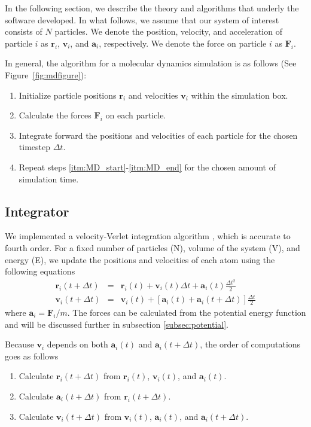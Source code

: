 \documentclass[12pt]{article}
\begin{document}
In the following section, we describe the theory and algorithms that underly the software developed.
%
In what follows, we assume that our system of interest consists of $N$ particles.
%
We denote the position, velocity, and acceleration of particle $i$ as $\mathbf{r}_i$, $\mathbf{v}_i$, and $\mathbf{a}_i$, respectively.
%
We denote the force on particle $i$ as $\mathbf{F}_i$.

In general, the algorithm for a molecular dynamics simulation is as follows (See Figure~\ref{fig:mdfigure}):

\begin{enumerate}
\item Initialize particle positions $\mathbf{r}_i$ and velocities $\mathbf{v}_i$ within the simulation box.
\item  \label{itm:MD_start} Calculate the forces $\mathbf{F}_i$ on each particle.
\item \label{itm:MD_end} Integrate forward the positions and velocities of each particle for the chosen timestep $\Delta t$.
\item Repeat steps \ref{itm:MD_start}-\ref{itm:MD_end} for the chosen amount of simulation time.
\end{enumerate}


\subsection{Integrator} \label{subsec:integrator}

We implemented a velocity-Verlet integration algorithm \cite{Swope1982}, which is accurate to fourth order.
%
For a fixed number of particles (N), volume of the system (V), and energy (E), we update the positions and velocities of each atom using the following equations
\begin{eqnarray}
\mathbf{r}_i (t + \Delta t)  & = & \mathbf{r}_i(t) + \mathbf{v}_i(t) \Delta t + \mathbf{a}_i(t) \frac{\Delta t^2}{2} \\
\mathbf{v}_i(t + \Delta t) & = & \mathbf{v}_i(t) + \left[\mathbf{a}_i(t) + \mathbf{a}_i(t + \Delta t) \right] \frac{\Delta t}{2}
\end{eqnarray}
where $\mathbf{a}_i = \mathbf{F}_i/m$.
%
The forces can be calculated from the potential energy function and will be discussed further in subsection \ref{subsec:potential}.

Because $\mathbf{v}_i$ depends on both $\mathbf{a}_i(t)$ and $\mathbf{a}_i(t+\Delta t)$, the order of computations goes as follows
\begin{enumerate}
\item Calculate $\mathbf{r}_i(t + \Delta t)$ from $\mathbf{r}_i(t)$, $\mathbf{v}_i(t)$, and $\mathbf{a}_i(t)$.
\item Calculate $\mathbf{a}_i(t + \Delta t)$ from $\mathbf{r}_i(t + \Delta t)$.
\item Calculate $\mathbf{v}_i(t + \Delta t)$ from $\mathbf{v}_i(t)$, $\mathbf{a}_i(t)$, and $\mathbf{a}_i(t + \Delta t)$.
\end{enumerate}
\end{document}

